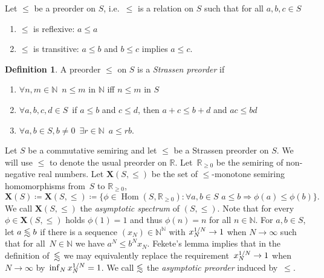 \documentclass[a4paper, fleqn]{amsart}
\theoremstyle{plain}
\theoremstyle{definition}
\newtheorem{definition}[theorem]{Definition}
\newcommand{\NN}{\mathbb{N}}
\newcommand{\RR}{\mathbb{R}}
\DeclareMathOperator{\Hom}{Hom}
\newcommand{\jeroen}[1]{#1}
\let\leqx\leqslant
\newcommand{\asympleqx}{%
  \mathrel{%
    \vphantom{\leqslant}%
    \smash{\vcenter{\doasympleqx}}%
  }%
}
\newcommand{\doasympleqx}{%
  \hbox{\ooalign{%
    \noalign{\kern.25ex}
    $\leqslant$\cr
    \noalign{\kern1.25ex}
    \smash{$\sim$}\cr
  }}%
}
\newcommand{\aspec}{\mathbf{X}}
\let\leqx\leqslant
\begin{document}
Let $\leqx$ be a preorder on $S$, i.e.~$\leqx$ is a relation on $S$ such that for all $a,b,c \in S$
\begin{enumerate}[label=\upshape(\arabic*)]
\item $\leqx$ is reflexive: $a\leqx a$
\item $\leqx$ is transitive: $a\leqx b$ and $b\leqx c$ implies $a\leqx c$.
\end{enumerate}
%
%
%
%
%
%
%
%
%
%
\begin{definition}\label{strassendef}
A preorder $\leqx$ on $S$ is a \emph{Strassen preorder} if
\begin{enumerate}[label=\upshape(\arabic*)]
\item $\forall n, m \in \NN$\, $n\leq m$ in $\NN$ iff $n \leqx m$ in $S$ \label{strcond1}
\item $\forall a,b,c,d \in S$\, if $a\leqx b$ and $c\leqx d$, then $a + c \leqx b + d$ and $ac \leqx bd$\label{strcond2}
\item $\forall a,b \in S, b\neq 0$\, $\exists r \in \NN$\, $a \leqx rb$.\label{strcond3}
\end{enumerate}
\end{definition}

Let $S$ be a commutative semiring %
and let $\leqx$ be a Strassen preorder on $S$. 
We will use $\leq$ to denote the usual preorder on $\RR$.
Let~$\RR_{\geq0}$ be the semiring of non-negative real numbers. 
%
%
Let $\aspec(S, \leqx)$ be the set of $\leqx$-monotone semiring homomorphisms from~$S$ to $\RR_{\geq0}$,
\[
%
\aspec(S) \coloneqq \aspec(S, \leqx) \coloneqq \{ \phi \in \Hom(S, \RR_{\geq 0}) : \forall a,b \in S\,\, a\leqx b \Rightarrow \phi(a) \leq \phi(b) \}.
\]
We call $\aspec(S, \leqx)$ the \emph{asymptotic spectrum} of $(S, \leqx)$.
\jeroen{Note that for every~$\phi \in \aspec(S, \leqx)$ holds $\phi(1) = 1$ and thus $\phi(n) = n$ for all $n \in \NN$.}
For $a,b \in S$, let $a \asympleqx b$ if there is a sequence $(x_N) \in \NN^\NN$ with $x_N^{\smash{1/N}}\to 1$ when $N \to \infty$ such that for all~$N\in\NN$ we have $a^{N} \leqx b^{N}  x_N$. Fekete's lemma implies that in the definition of~$\asympleqx$ we may equivalently replace the requirement~$x_N^{\smash{1/N}}\to 1$ when $N\to\infty$ by~$\inf_N x_N^{\smash{1/N}} = 1$.
We call $\asympleqx$ the \emph{asymptotic preorder} induced by~$\leqx$.
\end{document}
